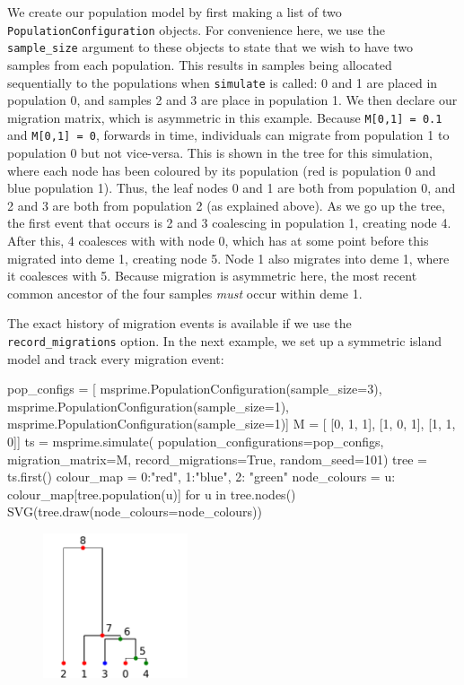 \documentclass[graybox]{svmult}
\newcommand{\includenbimage}[1]{\begin{center}\texttt{[image: \#1]}\end{center}}
\begin{document}
    We create our population model by first making a list of two
\texttt{PopulationConfiguration} objects. For convenience here, we use
the \texttt{sample\_size} argument to these objects to state that we
wish to have two samples from each population. This results in samples
being allocated sequentially to the populations when \texttt{simulate}
is called: 0 and 1 are placed in population 0, and samples 2 and 3 are
place in population 1. We then declare our migration matrix, which is
asymmetric in this example. Because \texttt{M{[}0,1{]}\ =\ 0.1} and
\texttt{M{[}0,1{]}\ =\ 0}, forwards in time, individuals can migrate
from population 1 to population 0 but not vice-versa. This is shown in
the tree for this simulation, where each node has been coloured by its
population (red is population 0 and blue population 1). Thus, the leaf
nodes 0 and 1 are both from population 0, and 2 and 3 are both from
population 2 (as explained above). As we go up the tree, the first event
that occurs is 2 and 3 coalescing in population 1, creating node 4.
After this, 4 coalesces with with node 0, which has at some point before
this migrated into deme 1, creating node 5. Node 1 also migrates into
deme 1, where it coalesces with 5. Because migration is asymmetric here,
the most recent common ancestor of the four samples \emph{must} occur
within deme 1.

The exact history of migration events is available if we use the
\texttt{record\_migrations} option. In the next example, we set up a
symmetric island model and track every migration event:

\begin{pythoncode}
pop_configs = [
    msprime.PopulationConfiguration(sample_size=3),
    msprime.PopulationConfiguration(sample_size=1),
    msprime.PopulationConfiguration(sample_size=1)]
M = [
    [0, 1, 1],
    [1, 0, 1],
    [1, 1, 0]]
ts  = msprime.simulate(
    population_configurations=pop_configs, migration_matrix=M,
    record_migrations=True, random_seed=101)
tree = ts.first()
colour_map = {0:"red", 1:"blue", 2: "green"}
node_colours = {
    u: colour_map[tree.population(u)] for u in tree.nodes()}
SVG(tree.draw(node_colours=node_colours))
\end{pythoncode}

\begin{figure}
  \begin{center}
    \includegraphics[width=0.38\textwidth]{images/simulations_28_0}
  \end{center}
\end{figure}
\end{document}
